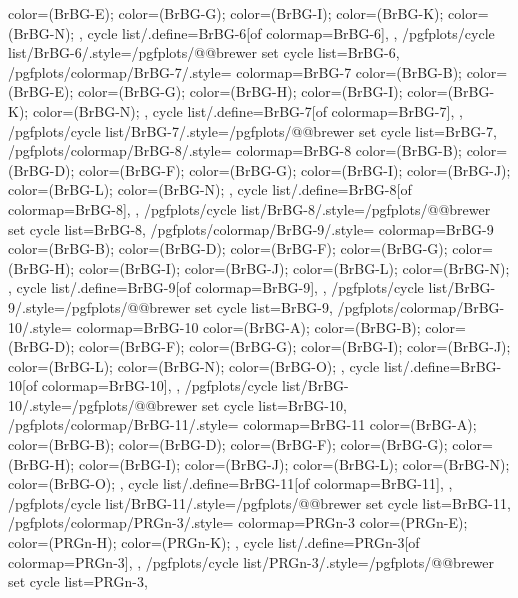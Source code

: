 {{{      color=(BrBG-E);
      color=(BrBG-G);
      color=(BrBG-I);
      color=(BrBG-K);
      color=(BrBG-N);
    },
    cycle list/.define={BrBG-6}{[of colormap=BrBG-6]},
  },
  /pgfplots/cycle list/BrBG-6/.style={/pgfplots/@@brewer set cycle list={BrBG-6}},
  /pgfplots/colormap/BrBG-7/.style={
    colormap={BrBG-7}{
      color=(BrBG-B);
      color=(BrBG-E);
      color=(BrBG-G);
      color=(BrBG-H);
      color=(BrBG-I);
      color=(BrBG-K);
      color=(BrBG-N);
    },
    cycle list/.define={BrBG-7}{[of colormap=BrBG-7]},
  },
  /pgfplots/cycle list/BrBG-7/.style={/pgfplots/@@brewer set cycle list={BrBG-7}},
  /pgfplots/colormap/BrBG-8/.style={
    colormap={BrBG-8}{
      color=(BrBG-B);
      color=(BrBG-D);
      color=(BrBG-F);
      color=(BrBG-G);
      color=(BrBG-I);
      color=(BrBG-J);
      color=(BrBG-L);
      color=(BrBG-N);
    },
    cycle list/.define={BrBG-8}{[of colormap=BrBG-8]},
  },
  /pgfplots/cycle list/BrBG-8/.style={/pgfplots/@@brewer set cycle list={BrBG-8}},
  /pgfplots/colormap/BrBG-9/.style={
    colormap={BrBG-9}{
      color=(BrBG-B);
      color=(BrBG-D);
      color=(BrBG-F);
      color=(BrBG-G);
      color=(BrBG-H);
      color=(BrBG-I);
      color=(BrBG-J);
      color=(BrBG-L);
      color=(BrBG-N);
    },
    cycle list/.define={BrBG-9}{[of colormap=BrBG-9]},
  },
  /pgfplots/cycle list/BrBG-9/.style={/pgfplots/@@brewer set cycle list={BrBG-9}},
  /pgfplots/colormap/BrBG-10/.style={
    colormap={BrBG-10}{
      color=(BrBG-A);
      color=(BrBG-B);
      color=(BrBG-D);
      color=(BrBG-F);
      color=(BrBG-G);
      color=(BrBG-I);
      color=(BrBG-J);
      color=(BrBG-L);
      color=(BrBG-N);
      color=(BrBG-O);
    },
    cycle list/.define={BrBG-10}{[of colormap=BrBG-10]},
  },
  /pgfplots/cycle list/BrBG-10/.style={/pgfplots/@@brewer set cycle list={BrBG-10}},
  /pgfplots/colormap/BrBG-11/.style={
    colormap={BrBG-11}{
      color=(BrBG-A);
      color=(BrBG-B);
      color=(BrBG-D);
      color=(BrBG-F);
      color=(BrBG-G);
      color=(BrBG-H);
      color=(BrBG-I);
      color=(BrBG-J);
      color=(BrBG-L);
      color=(BrBG-N);
      color=(BrBG-O);
    },
    cycle list/.define={BrBG-11}{[of colormap=BrBG-11]},
  },
  /pgfplots/cycle list/BrBG-11/.style={/pgfplots/@@brewer set cycle list={BrBG-11}},
  /pgfplots/colormap/PRGn-3/.style={
    colormap={PRGn-3}{
      color=(PRGn-E);
      color=(PRGn-H);
      color=(PRGn-K);
    },
    cycle list/.define={PRGn-3}{[of colormap=PRGn-3]},
  },
  /pgfplots/cycle list/PRGn-3/.style={/pgfplots/@@brewer set cycle list={PRGn-3}},
}
